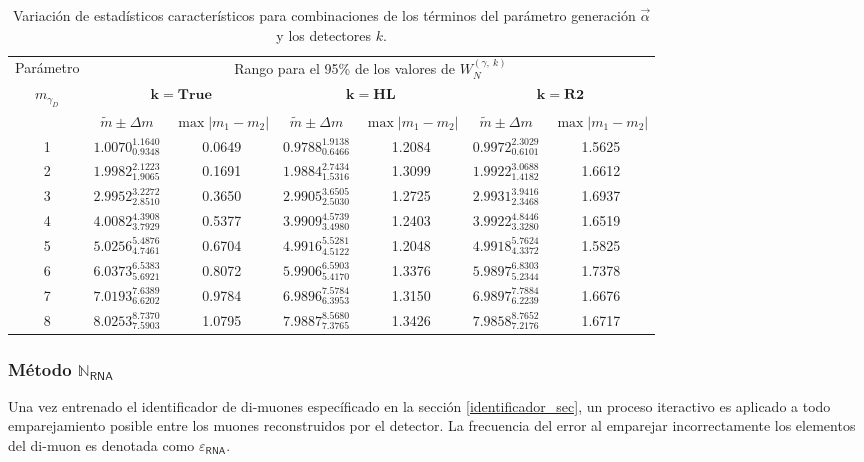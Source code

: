 \begin{table}[!t]
\centering
\scriptsize
\begin{tabular}{|c|cccccc|}
\toprule
Parámetro& \multicolumn{6}{c|}{Rango para el 95\% de los valores de $W_N^{(\gamma, ~ k)}$ }\\
$m_{\gamma_D}$ & \multicolumn{2}{c}{$\mathbf{k = True}$} & \multicolumn{2}{c}{$\mathbf{k = HL}$} & \multicolumn{2}{c|}{$\mathbf{k = R2}$}\\
& $\widetilde{m} \pm \Delta m$ & $\max{|m_1 - m_2|}$ & $\widetilde{m} \pm \Delta m$ & $\max{|m_1 - m_2|}$ & $\widetilde{m} \pm \Delta m$ & $\max{|m_1 - m_2|}$\\
\midrule
1 & $1.0070^{1.1640}_{0.9348}$ & 0.0649 & $0.9788^{1.9138}_{0.6466}$ & 1.2084 & $0.9972^{2.3029}_{0.6101}$ & 1.5625 \\ \midrule
2 & $1.9982^{2.1223}_{1.9065}$ & 0.1691 & $1.9884^{2.7434}_{1.5316}$ & 1.3099 & $1.9922^{3.0688}_{1.4182}$ & 1.6612\\ \midrule
3 & $2.9952^{3.2272}_{2.8510}$ & 0.3650 & $2.9905^{3.6505}_{2.5030}$ & 1.2725 & $2.9931^{3.9416}_{2.3468}$ & 1.6937\\ \midrule
4 & $4.0082^{4.3908}_{3.7929}$ & 0.5377 & $3.9909^{4.5739}_{3.4980}$ & 1.2403 & $3.9922^{4.8446}_{3.3280}$ & 1.6519\\ \midrule
5 & $5.0256^{5.4876}_{4.7461}$ & 0.6704 & $4.9916^{5.5281}_{4.5122}$ & 1.2048 & $4.9918^{5.7624}_{4.3372}$ & 1.5825 \\ \midrule
6 & $6.0373^{6.5383}_{5.6921}$ & 0.8072 & $5.9906^{6.5903}_{5.4170}$ & 1.3376 & $5.9897^{6.8303}_{5.2344}$ & 1.7378\\ \midrule
7 & $7.0193^{7.6389}_{6.6202}$ & 0.9784 & $6.9896^{7.5784}_{6.3953}$ & 1.3150 & $6.9897^{7.7884}_{6.2239}$ & 1.6676\\ \midrule
8 & $8.0253^{8.7370}_{7.5903}$ & 1.0795 & $7.9887^{8.5680}_{7.3765}$ & 1.3426 & $7.9858^{8.7652}_{7.2176}$ & 1.6717\\
\bottomrule 
\end{tabular}
\caption{Variación de estadísticos característicos para combinaciones de los términos del parámetro generación $\vec{\alpha}$ y los detectores $k$.}
\end{table}


\subsubsection{Método $\mathbb{N}_\textsf{RNA}$}
Una vez entrenado el identificador de di-muones específicado en la sección \ref{identificador_sec}, un proceso iteractivo es aplicado a todo emparejamiento posible entre los muones reconstruidos por el detector. La frecuencia del error al emparejar incorrectamente los elementos del di-muon es denotada como $\varepsilon_\textsf{RNA}$.

